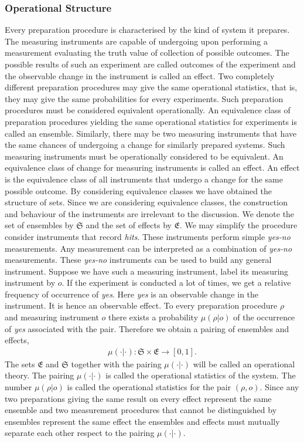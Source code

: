 \documentclass[11pt]{article}
\begin{document}
\subsubsection*{Operational Structure}\label{sec:gpt}
Every preparation procedure is characterised by the kind of system it prepares. The measuring instruments are capable of undergoing upon performing a measurement evaluating the truth value of collection of possible outcomes. The possible results of such an experiment are called outcomes of the experiment and the observable change in the instrument is called an effect. Two completely different preparation procedures may give the same operational statistics, that is, they may give the same probabilities for every experiments. Such preparation procedures must be considered equivalent operationally. An equivalence class of preparation procedures yielding the same operational statistics for experiments is called an ensemble. Similarly, there may be two measuring instruments that have the same chances of undergoing a change for similarly prepared systems. Such measuring instruments must be operationally considered to be equivalent. An equivalence class of change for measuring instruments is called an effect. An effect is the equivalence class of all instruments that undergo a change for the same possible outcome. By considering equivalence classes we have obtained the structure of sets. Since we are considering equivalence classes, the construction and behaviour of the instruments are irrelevant to the discussion. We denote the set of ensembles by $\mathfrak{S}$ and the set of effects by $\mathfrak{E}$. We may simplify the procedure consider instruments that record \emph{hits}. These instruments perform simple \emph{yes-no} measurements. Any measurement can be interpreted as a combination of \emph{yes-no} measurements. These \emph{yes-no} instruments can be used to build any general instrument. Suppose we have such a measuring instrument, label its measuring instrument by $o$. If the experiment is conducted a lot of times, we get a relative frequency of occurrence of \emph{yes}. Here \emph{yes} is an observable change in the instrument. It is hence an observable effect. To every preparation procedure $\rho$ and measuring instrument $o$ there exists a probability $\mu(\rho| o)$ of the occurrence of \emph{yes} associated with the pair. Therefore we obtain a pairing of ensembles and effects,
\begin{align*}
\mu(\cdot|\cdot):\mathfrak{S}\times \mathfrak{E}\longrightarrow[0,1].
\end{align*}
The sets $\mathfrak{E}$ and $\mathfrak{S}$ together with the pairing $\mu(\cdot|\cdot)$ will be called an operational theory. The pairing $\mu(\cdot|\cdot)$ is called the operational statistics of the system. The number $\mu(\rho|o)$ is called the operational statistics for the pair $(\rho,o)$. Since any two preparations giving the same result on every effect represent the same ensemble and two measurement procedures that cannot be distinguished by ensembles represent the same effect the ensembles and effects must mutually separate each other respect to the pairing $\mu(\cdot|\cdot)$.
\end{document}
